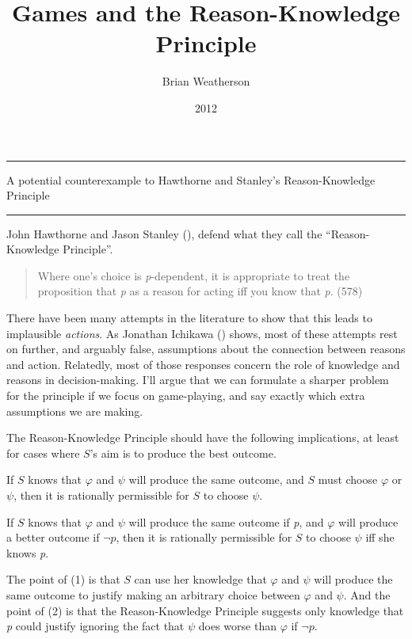 \documentclass[
  10pt,
  letterpaper,
  DIV=11,
  numbers=noendperiod,
  twoside]{scrartcl}
\title{Games and the Reason-Knowledge Principle}
\author{Brian Weatherson}
\date{2012}
\providecommand{\tightlist}{%
  \setlength{\itemsep}{0pt}\setlength{\parskip}{0pt}}\usepackage{longtable,booktabs,array}
\renewenvironment{abstract}
 {\vspace{-1.25cm}
 \quotation\small\noindent\rule{\linewidth}{.5pt}\par\smallskip
 \noindent }
 {\par\noindent\rule{\linewidth}{.5pt}\endquotation}
\begin{document}
\maketitle
\begin{abstract}
A potential counterexample to Hawthorne and Stanley's Reason-Knowledge
Principle
\end{abstract}


John Hawthorne and Jason Stanley
(), defend what they call the
``Reason-Knowledge Principle''.

\begin{quote}
Where one's choice is \emph{p}-dependent, it is appropriate to treat the
proposition that \emph{p} as a reason for acting iff you know that
\emph{p}. (578)
\end{quote}

There have been many attempts in the literature to show that this leads
to implausible \emph{actions}. As Jonathan Ichikawa
() shows, most of these attempts rest
on further, and arguably false, assumptions about the connection between
reasons and action. Relatedly, most of those responses concern the role
of knowledge and reasons in decision-making. I'll argue that we can
formulate a sharper problem for the principle if we focus on
game-playing, and say exactly which extra assumptions we are making.

The Reason-Knowledge Principle should have the following implications,
at least for cases where \(S\)'s aim is to produce the best outcome.

\begin{description}
\tightlist
\item[(1)]
If \(S\) knows that \(\varphi\) and \(\psi\) will produce the same
outcome, and \(S\) must choose \(\varphi\) or \(\psi\), then it is
rationally permissible for \(S\) to choose \(\psi\).
\item[(2)]
If \(S\) knows that \(\varphi\) and \(\psi\) will produce the same
outcome if \emph{p}, and \(\varphi\) will produce a better outcome if
\(\neg p\), then it is rationally permissible for \(S\) to choose
\(\psi\) iff she knows \emph{p}.
\end{description}

The point of (1) is that \(S\) can use her knowledge that \(\varphi\)
and \(\psi\) will produce the same outcome to justify making an
arbitrary choice between \(\varphi\) and \(\psi\). And the point of (2)
is that the Reason-Knowledge Principle suggests only knowledge that
\emph{p} could justify ignoring the fact that \(\psi\) does worse than
\(\varphi\) if \(\neg p\).
\end{document}
